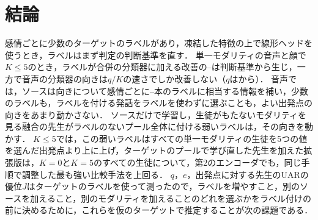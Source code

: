 \section{結論}
\label{sec:conclusion}

感情ごとに少数のターゲットのラベルがあり，凍結した特徴の上で線形ヘッドを使うとき，ラベルはまず判定の判断基準を直す．
単一モダリティの音声と顔で$K \le 5$のとき，ラベルが合併の分類器に加える改善の--は判断基準から生じ，一方で音声の分類器の向きは$q/K$の速さでしか改善しない（$q$はから）．
音声では，ソースは向きについて感情ごとに--本のラベルに相当する情報を補い，少数のラベルも，ラベルを付ける発話をラベルを使わずに選ぶことも，よい出発点の向きをあまり動かさない．
ソースだけで学習し，生徒がもたないモダリティを見る融合の先生がラベルのないプール全体に付ける弱いラベルは，その向きを動かす．
$K \le 5$では，この弱いラベルはすべての単一モダリティの生徒を5つの値を選んだ出発点より上に上げ，ターゲットのプールで学び直した先生を加えた拡張版は，$K=0$と$K=5$のすべての生徒について，第2のエンコーダでも，同じ手順で調整した最も強い比較手法を上回る．
$q$，$e$，出発点に対する先生のUARの優位$J$はターゲットのラベルを使って測ったので，ラベルを増やすこと，別のソースを加えること，別のモダリティを加えることのどれを選ぶかをラベル付けの前に決めるために，これらを仮のターゲットで推定することが次の課題である．
